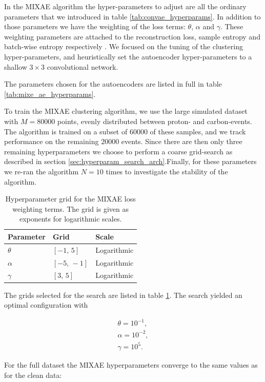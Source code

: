 \documentclass[review,number,sort&compress]{elsarticle}
\begin{document}
In the MIXAE algorithm the hyper-parameters to adjust are all the ordinary parameters that we introduced in table \ref{tab:convae_hyperparams}. In addition to those parameters we have the weighting of the loss terms: $\theta$, $\alpha$ and $\gamma$. These weighting parameters are attached to the reconstruction loss, sample entropy and batch-wise entropy respectively \cite{Zhang}. 
We focused on the tuning of the clustering hyper-parameters, and heuristically set the autoencoder hyper-parameters to a shallow $3\times3$ convolutional network.  

The parameters chosen for the autoencoders are listed in full in table \ref{tab:mixe_ae_hyperparams}.

To train the MIXAE clustering algorithm, we use the large simulated dataset with $M=80000$ points, evenly distributed between proton- and carbon-events. The algorithm is trained on a subset of $60000$ of these samples, and we track performance on the remaining $20000$ events. Since there are then only three remaining hyperparameters we choose to perform a coarse grid-search as described in section \ref{sec:hyperparam_search_arch}.Finally, for these parameters we re-ran the algorithm $N=10$ times to investigate the stability of the algorithm.

\begin{table}
\centering
\caption{Hyperparameter grid for the MIXAE loss weighting terms. The grid is given as exponents for logarithmic scales.}\label{tab:mixae_loss_weights}
\begin{tabular}{lll}
\toprule
Parameter & Grid & Scale \\
\midrule 
$\theta$ & $[-1,\, 5]$ & Logarithmic \\
$\alpha$ & $[-5,\, -1]$ & Logarithmic \\
$\gamma$ & $[3,\, 5]$ & Logarithmic
\end{tabular}
\end{table}

The grids selected for the search are listed in table \ref{tab:mixae_loss_weights}. The search yielded an optimal configuration with 

\begin{align}
\theta = 10^{-1}, \\
\alpha = 10^{-2}, \\
\gamma = 10^5.
\end{align}

For the full dataset the MIXAE hyperparameters converge to the same values as for the clean data:
\end{document}
